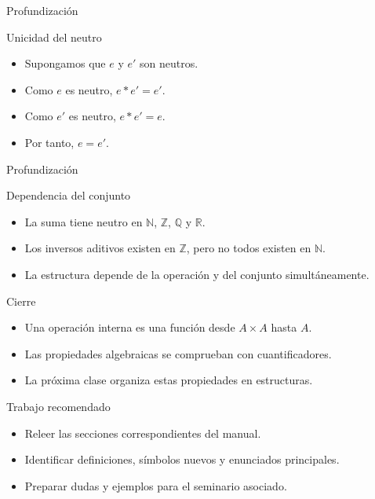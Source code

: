 \documentclass[aspectratio=169,11pt]{beamer}
\begin{document}
\begin{frame}{Profundización}
\begin{block}{Unicidad del neutro}
\begin{itemize}
  \item Supongamos que \(e\) y \(e'\) son neutros.
  \item Como \(e\) es neutro, \(e*e'=e'\).
  \item Como \(e'\) es neutro, \(e*e'=e\).
  \item Por tanto, \(e=e'\).
\end{itemize}
\end{block}
\end{frame}

\begin{frame}{Profundización}
\begin{block}{Dependencia del conjunto}
\begin{itemize}
  \item La suma tiene neutro en \(\mathbb{N}\), \(\mathbb{Z}\), \(\mathbb{Q}\) y \(\mathbb{R}\).
  \item Los inversos aditivos existen en \(\mathbb{Z}\), pero no todos existen en \(\mathbb{N}\).
  \item La estructura depende de la operación y del conjunto simultáneamente.
\end{itemize}
\end{block}
\end{frame}

\begin{frame}{Cierre}
\begin{itemize}
  \item Una operación interna es una función desde \(A\times A\) hasta \(A\).
  \item Las propiedades algebraicas se comprueban con cuantificadores.
  \item La próxima clase organiza estas propiedades en estructuras.
\end{itemize}
\end{frame}

\begin{frame}{Trabajo recomendado}
\begin{itemize}
  \item Releer las secciones correspondientes del manual.
  \item Identificar definiciones, símbolos nuevos y enunciados principales.
  \item Preparar dudas y ejemplos para el seminario asociado.
\end{itemize}
\end{frame}
\end{document}
